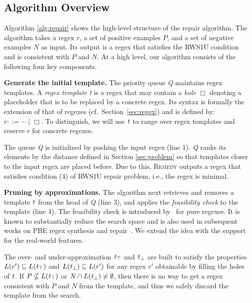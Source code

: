 \documentclass[conference]{IEEEtran}
\newcommand{\tool}{\textsc{Remedy}}
\newcommand{\queue}{{\it Q}}
\newcommand{\hole}{\Box}
\newcommand{\sstate}{{\it t}}
\newcommand{\ltp}{RWS1U}
\begin{document}
\subsection{Algorithm Overview}
\label{subsec:overview}
Algorithm \ref{alg:repair} shows the high-level structure of the repair algorithm.
The algorithm takes a regex $r$, a set of positive examples $P$, and a set of negative examples $N$ as input.
Its output is a regex that satisfies the \ltp{} condition and is consistent with $P$ and $N$.
At a high level, our algorithm consists of the following four key components.

{\flushleft\bf Generate the initial template.}
The priority queue \queue{} maintains regex templates.  A {\em regex template} \sstate{} is a regex that may contain a {\em hole} $\hole{}$ denoting a placeholder that is to be replaced by a concrete regex.  Its syntax is formally the extension of that of regexes (cf.~Section~\ref{sec:regex}) and is defined by: $r ::= \cdots \mid \hole{}$.  To distinguish, we will use $\sstate{}$ to range over regex templates and reserve $r$ for concrete regexes.



The queue \queue{} is initialized by pushing the input regex (line 1).
\queue{} ranks its elements by the distance defined in Section \ref{sec:problem} so that templates closer to the input regex are placed before. 
Due to this, \tool{} outputs a regex that satisfies condition (4) of \ltp{} repair problem, i.e., the regex is minimal. 



{\flushleft\bf Pruning by approximations.}
The algorithm next retrieves and removes a template $\sstate$ from the head of \queue{} (line 3), and applies the {\it feasibility check} to the template (line 4).
The feasibility check is introduced by~\cite{10.1145/3093335.2993244} for pure regexes.  It is known to substantially reduce the search space and is also used in subsequent works on PBE regex synthesis and repair~\cite{10.1145/3360565, DBLP:journals/corr/abs-1908-03316}.  We extend the idea with the support for the real-world features.

The over- and under-approximation $\sstate{}_\top$ and $\sstate{}_\bot$ are built to satisfy the properties $L(r') \subseteq L(\sstate{}_\top)$ and $L(\sstate{}_\bot) \subseteq L(r')$ for any regex $r'$ obtainable by filling the holes of $\sstate$.  If $P \nsubseteq L(\sstate{}_\top)$ or $N \cap L(\sstate{}_\bot) \not= \emptyset$, then there is no way to get a regex consistent with $P$ and $N$ from the template, and thus we safely discard the template from the search.
\end{document}
